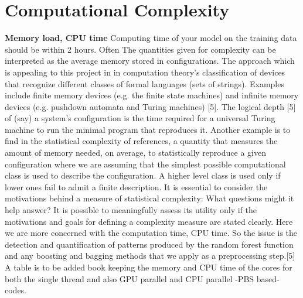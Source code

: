 \documentclass[journal]{/home/hoofar/LatexClasses/IEEEtran}
\begin{document}
\section{Computational Complexity}
\textbf{Memory load, CPU time} Computing time of your model on the training data should be within 2 hours. 
 Often The quantities given for complexity can be interpreted as the average
memory stored in configurations.
The approach which is appealing to this project in in computation
theory’s classification of devices that recognize different classes of formal languages (sets of strings). Examples include finite memory devices (e.g. the finite state machines) and infinite memory devices (e.g. pushdown automata and Turing machines) [5]. The logical depth [5] of (say) a system’s configuration is the time required for a universal
Turing machine to run the minimal program that reproduces it. Another example is to find in the statistical complexity of
references, a quantity that measures the amount of
memory needed, on average, to statistically reproduce a
given configuration where we are assuming that the simplest possible computational
class is used to describe the configuration. A higher level
class is used only if lower ones fail to admit a finite description.  It is essential to consider the motivations behind a measure of statistical complexity: What questions might it help answer? 
It is possible to meaningfully assess its utility only if 
the motivations and goals for defining a complexity measure are stated clearly. Here we are more concerned with the computation time, CPU time. So the issue is the detection 
  and quantification of patterns produced by the random forest function and any boosting and bagging methods that we apply as a preprocessing step.[5] A table is to be added book keeping the memory and CPU time of the cores for both the single thread and also GPU parallel and CPU parallel -PBS based- codes. 





\end{document}
